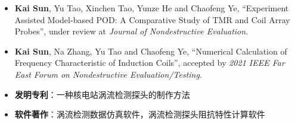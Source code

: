 \begin{itemize}
    \item \textbf{Kai Sun}, Yu Tao, Xinchen Tao, Yunze He and Chaofeng Ye,
          ``Experiment Assisted Model-based POD: A Comparative Study of TMR and Coil Array Probes'',
          under review at \emph{Journal of Nondestructive Evaluation}.\\
          { \footnotesize {}}
    \item \textbf{Kai Sun}, Na Zhang, Yu Tao and Chaofeng Ye,
          ``Numerical Calculation of Frequency Characteristic of Induction Coils'',
          accepted by \emph{2021 IEEE Far East Forum on Nondestructive Evaluation/Testing}.\\
          { \footnotesize {}}
    \item \textbf{发明专利}：一种核电站涡流检测探头的制作方法
    \item \textbf{软件著作}：涡流检测数据仿真软件，涡流检测探头阻抗特性计算软件
\end{itemize}